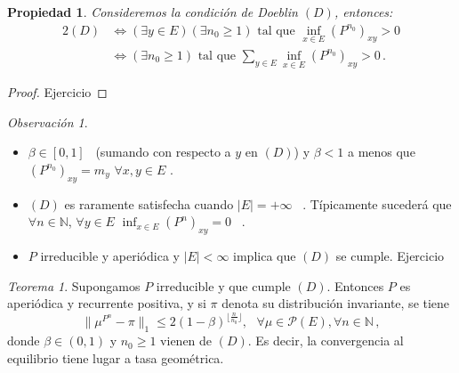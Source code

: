 \documentclass[letterpaper,11pt]{article} %
\theoremstyle{defbreak}
\theoremstyle{propbreak}
\newtheorem{property}{Propiedad}[subsection]
\theoremstyle{remark}
\newtheorem{remark}{Observación}[subsection]
\theoremstyle{break}
\newtheorem{theorem}{Teorema}[subsection]
\def\N{\mathbb{N}}
\def\ejercicio{\color{blue}Ejercicio\color{black}}
\def\beforeitemize{\leavevmode \vspace{-0.5\baselineskip}}
\begin{document}
\begin{property}
Consideremos la condición de Doeblin $(D)$, entonces:
\begin{alignat*}{2}
    (D) & \Longleftrightarrow (\exists y\in E)(\exists n_0 \geq 1) \mbox{ tal que }\displaystyle \inf_{x\in E}(P^{n_0})_{xy}>0 \\
     & \Longleftrightarrow (\exists n_0 \geq 1) \mbox{ tal que } \displaystyle \sum_{y\in E}\inf_{x\in E}(P^{n_0})_{xy}>0 \, .
\end{alignat*}
\end{property}
\begin{proof}
\ejercicio
\end{proof}
\begin{remark}
\beforeitemize
\begin{itemize}
    \item $\beta\in[0,1]$ \, (sumando con respecto a $y$ en $(D)$) y $\beta<1$ a menos que $(P^{n_0})_{xy}=m_y$ $\forall x,y\in E$ .
    \item $(D)$ es raramente satisfecha cuando $|E|=+\infty$ \, .
    Típicamente sucederá que $\forall n\in \N$, $\forall y\in E$ $\inf_{x\in E}(P^n)_{xy}=0$ \, .
    \item $P$ irreducible y aperiódica y $|E|<\infty$ implica que $(D)$ se cumple.
    \newline     \ejercicio
\end{itemize}
\end{remark}
\begin{theorem}
Supongamos $P$ irreducible y que cumple $(D)$. Entonces $P$ es aperiódica y recurrente positiva, y si $\pi$ denota su distribución invariante, se tiene
$$ \|\mu^{P^n}-\pi\|_1\leq 2(1-\beta)^{\lfloor\frac{n}{n_0}\rfloor}, \mbox{ } \forall \mu\in \mathcal{P}(E),\forall n\in\N\,,$$
donde $\beta\in(0,1)$ y $n_0\geq 1$ vienen de $(D)$. Es decir, la convergencia  al equilibrio tiene lugar a tasa geométrica.
\end{theorem}
\end{document}
